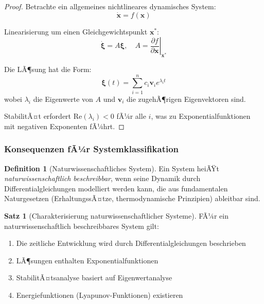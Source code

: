 ﻿\documentclass[a4paper,12pt]{scrreprt}
\theoremstyle{definition}
\newtheorem{definition}{Definition}[section]
\newtheorem{satz}{Satz}[section]
\begin{document}
\begin{proof}
	Betrachte ein allgemeines nichtlineares dynamisches System:
	\begin{equation}
		\dot{\mathbf{x}} = f(\mathbf{x})
	\end{equation}
	
	Linearisierung um einen Gleichgewichtspunkt $\mathbf{x}^*$:
	\begin{equation}
		\dot{\mathbf{\xi}} = A \mathbf{\xi}, \quad A = \left. \frac{\partial f}{\partial \mathbf{x}} \right|_{\mathbf{x}^*}
	\end{equation}
	
	Die LÃ¶sung hat die Form:
	\begin{equation}
		\mathbf{\xi}(t) = \sum_{i=1}^{n} c_i \mathbf{v}_i e^{\lambda_i t}
	\end{equation}
	wobei $\lambda_i$ die Eigenwerte von $A$ und $\mathbf{v}_i$ die zugehÃ¶rigen Eigenvektoren sind.
	
	StabilitÃ¤t erfordert $\text{Re}(\lambda_i) < 0$ fÃ¼r alle $i$, was zu Exponentialfunktionen mit negativen Exponenten fÃ¼hrt.
\end{proof}

\subsubsection{Konsequenzen fÃ¼r Systemklassifikation}

\begin{definition}[Naturwissenschaftliches System]
	Ein System heiÃŸt \textit{naturwissenschaftlich beschreibbar}, wenn seine Dynamik durch Differentialgleichungen modelliert werden kann, die aus fundamentalen Naturgesetzen (ErhaltungssÃ¤tze, thermodynamische Prinzipien) ableitbar sind.
\end{definition}

\begin{satz}[Charakterisierung naturwissenschaftlicher Systeme]
	FÃ¼r ein naturwissenschaftlich beschreibbares System gilt:
	\begin{enumerate}
		\item[-] Die zeitliche Entwicklung wird durch Differentialgleichungen beschrieben
		\item[-] LÃ¶sungen enthalten Exponentialfunktionen
		\item[-] StabilitÃ¤tsanalyse basiert auf Eigenwertanalyse
		\item[-] Energiefunktionen (Lyapunov-Funktionen) existieren
	\end{enumerate}
\end{satz}
\end{document}

